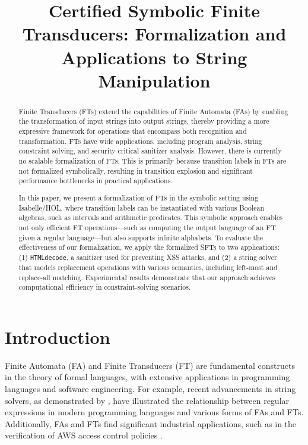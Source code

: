 \documentclass[sigplan,10pt,anonymous,review]{acmart}\settopmatter{printfolios=true,printccs=false,printacmref=false}
\begin{document}
\setlength{\pdfpageheight}{\paperheight}
\setlength{\pdfpagewidth}{\paperwidth}



\title{Certified Symbolic Finite Transducers: Formalization and Applications to String Manipulation}


\begin{abstract}
Finite Transducers (FTs) extend the capabilities of Finite Automata (FAs) by enabling the transformation of input strings into output strings, thereby providing a more expressive framework for operations that encompass both recognition and transformation. FTs have wide applications, including program analysis, string constraint solving, and security-critical sanitizer analysis.
However, there is currently no scalable formalization of FTs. This is primarily because transition labels in FTs are not formalized symbolically, resulting in transition explosion and significant performance bottlenecks in practical applications.

In this paper, we present a formalization of FTs in the symbolic setting using Isabelle/HOL, where transition labels can be instantiated with various Boolean algebras, such as intervals and arithmetic predicates. This symbolic approach enables not only efficient FT operations—such as computing the output language of an FT given a regular language—but also supports infinite alphabets.
%
To evaluate the effectiveness of our formalization, we apply the formalized SFTs to two applications: (1) \texttt{HTMLdecode}, a sanitizer used for preventing XSS attacks, and (2) a string solver that models replacement operations with various semantics, including left-most and replace-all matching. Experimental results demonstrate that our approach achieves computational efficiency in constraint-solving scenarios.
\end{abstract}

\maketitle

\section{Introduction}
\label{sec:introduction}

Finite Automata (FA) and Finite Transducers (FT) are fundamental constructs in the theory of formal languages, with extensive applications in programming languages and software engineering. For example, recent advancements in string solvers, as demonstrated by \cite{pacmpl/ChenFHHHKLRW22}, have illustrated the relationship between regular expressions in modern programming languages and various forms of FAs and FTs. Additionally, FAs and FTs find significant industrial applications, such as in the verification of AWS access control policies \cite{DBLP:conf/fmcad/BackesBCDGLRTV18}.
\end{document}
